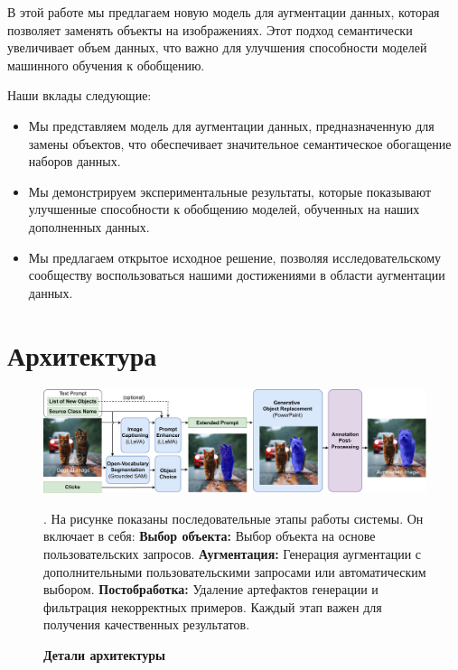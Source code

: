 \documentclass[11pt]{article}
\begin{document}
В этой работе мы предлагаем новую модель для аугментации данных, которая позволяет заменять объекты на изображениях. Этот подход семантически увеличивает объем данных, что важно для улучшения способности моделей машинного обучения к обобщению.


Наши вклады следующие:
\begin{itemize}
    \item Мы представляем модель для аугментации данных, предназначенную для замены объектов, что обеспечивает значительное семантическое обогащение наборов данных.
    \item Мы демонстрируем экспериментальные результаты, которые показывают улучшенные способности к обобщению моделей, обученных на наших дополненных данных.
    \item Мы предлагаем открытое исходное решение, позволяя исследовательскому сообществу воспользоваться нашими достижениями в области аугментации данных. 
\end{itemize}

\section{Архитектура}

\begin{figure}[h]
    \centering
    \includegraphics[width=\textwidth]{figures/scheme_augmented.pdf}
    \caption \textbf{Детали архитектуры}. На рисунке показаны последовательные этапы работы системы. Он включает в себя:
\textbf{Выбор объекта:} Выбор объекта на основе пользовательских запросов.
\textbf{Аугментация:} Генерация аугментации с дополнительными пользовательскими запросами или автоматическим выбором.
\textbf{Постобработка:} Удаление артефактов генерации и фильтрация некорректных примеров. Каждый этап важен для получения качественных результатов.
    \label{fig:internal_framework}
\end{figure}
\end{document}
